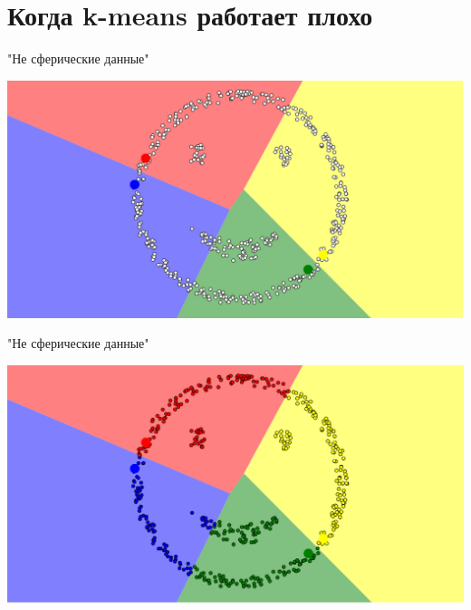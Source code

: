 \documentclass[10pt]{beamer}
\begin{document}


\section{Когда k-means работает плохо}

\begin{frame}{"Не сферические данные"}
	\begin{center}
	  \includegraphics[width=\textwidth, keepaspectratio = true]{images/non_spherical-1}  
	\end{center}
\end{frame}	

\begin{frame}{"Не сферические данные"}
	\begin{center}
	  \includegraphics[width=\textwidth, keepaspectratio = true]{images/non_spherical-2}  
	\end{center}
\end{frame}	
\end{document}
